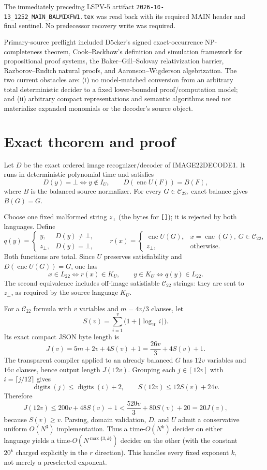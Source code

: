 \documentclass[11pt]{article}
\newcommand{\Ltwo}{L_{22}}
\newcommand{\KU}{K_U}
\begin{document}
The immediately preceding LSPV-5 artifact \texttt{2026-10-13\_1252\_MAIN\_BALMIXFW1.tex} was read back with its required MAIN header and final sentinel.  No predecessor recovery write was required.

Primary-source preflight included D\"ocker's signed exact-occurrence NP-completeness theorem, Cook--Reckhow's definition and simulation framework for propositional proof systems, the Baker--Gill--Solovay relativization barrier, Razborov--Rudich natural proofs, and Aaronson--Wigderson algebrization.  The two current obstacles are: (i) no model-matched conversion from an arbitrary total deterministic decider to a fixed lower-bounded proof/computation model; and (ii) arbitrary compact representations and semantic algorithms need not materialize expanded monomials or the decoder's source object.

\section*{Exact theorem and proof}
Let $D$ be the exact ordered image recognizer/decoder of IMAGE22DECODE1.  It runs in deterministic polynomial time and satisfies
\[
 D(y)=\bot\iff y\notin I_U,
 \qquad D(\operatorname{enc}U(F))=B(F),
\]
where $B$ is the balanced source normalizer.  For every $G\in\mathcal C_{22}$, exact balance gives $B(G)=G$.

Choose one fixed malformed string $z_\bot$ (the bytes for \texttt{[]}); it is rejected by both languages.  Define
\[
 q(y)=\begin{cases}y,&D(y)\ne\bot,\\z_\bot,&D(y)=\bot,
 \end{cases}
\qquad
 r(x)=\begin{cases}
 \operatorname{enc}U(G),&x=\operatorname{enc}(G),\ G\in\mathcal C_{22},\\
 z_\bot,&\text{otherwise}.
 \end{cases}
\]
Both functions are total.  Since $U$ preserves satisfiability and $D(\operatorname{enc}U(G))=G$, one has
\[
 x\in\Ltwo\iff r(x)\in\KU,
 \qquad
 y\in\KU\iff q(y)\in\Ltwo.
\]
The second equivalence includes off-image satisfiable $\mathcal C_{22}$ strings: they are sent to $z_\bot$, as required by the source language $\KU$.

For a $\mathcal C_{22}$ formula with $v$ variables and $m=4v/3$ clauses, let
\[
 S(v)=\sum_{i=1}^{v}\bigl(1+\lfloor\log_{10}i\rfloor\bigr).
\]
Its exact compact JSON byte length is
\[
 J(v)=5m+2v+4S(v)+1=\frac{26v}{3}+4S(v)+1.
\]
The transparent compiler applied to an already balanced $G$ has $12v$ variables and $16v$ clauses, hence output length $J(12v)$.  Grouping each $j\in[12v]$ with $i=\lceil j/12\rceil$ gives
\[
 \operatorname{digits}(j)\leq \operatorname{digits}(i)+2,
 \qquad S(12v)\leq12S(v)+24v.
\]
Therefore
\[
 J(12v)\leq200v+48S(v)+1<\frac{520v}{3}+80S(v)+20=20J(v),
\]
because $S(v)\geq v$.  Parsing, domain validation, $D$, and $U$ admit a conservative uniform $O(N^3)$ implementation.  Thus a time-$O(N^k)$ decider on either language yields a time-$O(N^{\max\{3,k\}})$ decider on the other (with the constant $20^k$ charged explicitly in the $r$ direction).  This handles every fixed exponent $k$, not merely a preselected exponent.
\end{document}
